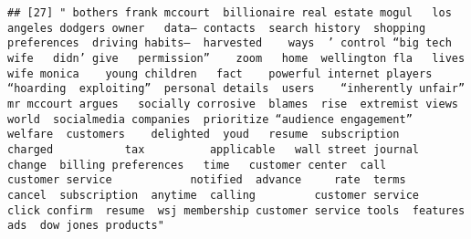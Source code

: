 \documentclass[
]{article}
\begin{document}
\begin{verbatim}
## [27] " bothers frank mccourt  billionaire real estate mogul   los angeles dodgers owner   data— contacts  search history  shopping preferences  driving habits—  harvested    ways  ’ control “big tech       wife   didn’ give   permission”    zoom   home  wellington fla   lives   wife monica    young children   fact    powerful internet players  “hoarding  exploiting”  personal details  users    “inherently unfair” mr mccourt argues   socially corrosive  blames  rise  extremist views       world  socialmedia companies  prioritize “audience engagement”   welfare  customers    delighted  youd   resume  subscription    charged           tax          applicable   wall street journal           change  billing preferences   time   customer center  call         customer service            notified  advance     rate  terms           cancel  subscription  anytime  calling         customer service         click confirm  resume  wsj membership customer service tools  features ads  dow jones products"                                                                                                                                                                                                                                                                                                                                                                                                                                                                                                                                                                                                                                                                                                                                                                                                                                                                                                                                                                                                                                                                                                                                                                                                                                                                                                                                                                                                                                                                                                                                                                                                                                                                                                                                                                                                                                                                                                                                                                                                                                                                                                                                                                                                                                                                                                                                                                                                          
\end{verbatim}
\end{document}
